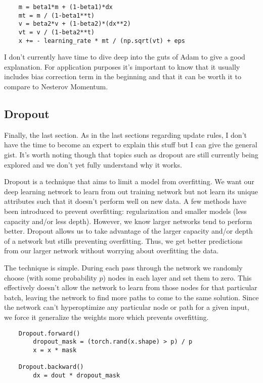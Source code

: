 \documentclass[12pt]{article}
\begin{document}
\begin{verbatim}
    m = beta1*m + (1-beta1)*dx
    mt = m / (1-beta1**t)
    v = beta2*v + (1-beta2)*(dx**2)
    vt = v / (1-beta2**t)
    x += - learning_rate * mt / (np.sqrt(vt) + eps
\end{verbatim}

I don't currently have time to dive deep into the guts of Adam to give a good explanation.
For application purposes it's important to know that it usually includes bias correction term 
in the beginning and that it can be worth it to compare to Nesterov Momentum. 


\subsection{Dropout}
Finally, the last section. As in the last sections regarding update rules, I don't have the time 
to become an expert to explain this stuff but I can give the general gist. It's worth noting though
that topics such as dropout are still currently being explored and we don't yet fully understand 
why it works. 

Dropout is a technique that aims to limit a model from overfitting. We want our deep learning network
to learn from out training network but not learn its unique attributes such that it doesn't perform 
well on new data. A few methods have been introduced to prevent overfitting: regularization and smaller
models (less capacity and/or less depth). However, we know larger networks tend to perform better. Dropout allows us 
to take advantage of the larger capacity and/or depth of a network but stills preventing overfitting. Thus,
we get better predictions from our larger network without worrying about overfitting the data. 

The technique is simple. During each pass through the network we randomly choose (with some probability
$p$) nodes in each layer and set them to zero. This effectively doesn't allow the network to learn from 
those nodes for that particular batch, leaving the network to find more paths to come to the same solution.
Since the network can't hyperoptimize any particular node or path for a given input, we force it 
generalize the weights more which prevents overfitting. 

\begin{verbatim}
    Dropout.forward()
        dropout_mask = (torch.rand(x.shape) > p) / p
        x = x * mask

    Dropout.backward()
        dx = dout * dropout_mask
\end{verbatim}
\end{document}
